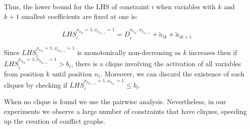 \documentclass{endm}
\begin{document}
\noindent Thus, the lower bound for the LHS of constraint $i$ when variables with $k$ and $k+1$ smallest coefficients are fixed at one is:  

\begin{equation}
LHS_{i}^{x_{\acute{a}_{ik}} = 1, x_{\acute{a}_{ik+1}} = 1} = D_{i}^{x_{\acute{a}_{ik}}, x_{\acute{a}_{ik+1}}} + \tilde{a}_{ik} + \tilde{a}_{ik+1}
\end{equation}

Since $LHS_{i}^{x_{\acute{a}_{ik}} = 1, x_{\acute{a}_{ik+1}} = 1}$ is monotonically non-decreasing as $k$ increases then if $LHS_{i}^{x_{\acute{a}_{ik}} = 1, x_{\acute{a}_{ik+1}} = 1} > b_{i}$, there is a clique involving the activation of all variables from position $k$ until position $n_i$. Moreover, we can discard the existence of such cliques by checking if $LHS_{i}^{x_{\acute{a}_{in_i-1}} = 1, x_{\acute{a}_{in_i}} = 1} \leq b_i$.

When no clique is found we use the pairwise analysis. Nevertheless, in our experiments we observe a large number of constraints that have cliques, speeding up the creation of conflict graphs.
\end{document}
